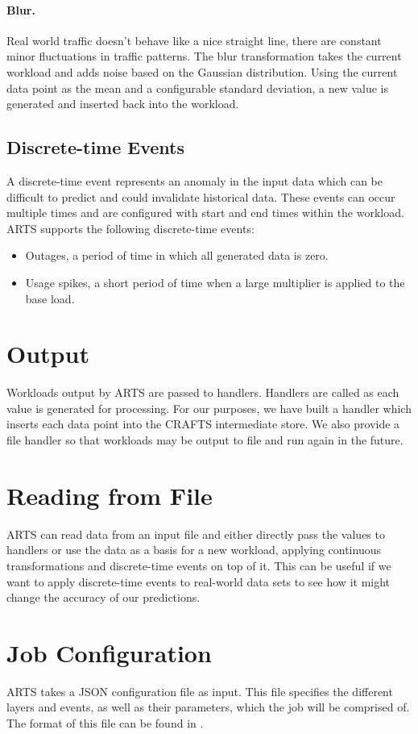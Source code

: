 \paragraph{Blur.} Real world traffic doesn't behave like a nice straight line, there are constant minor fluctuations in traffic patterns. The blur transformation takes the current workload and adds noise based on the Gaussian distribution. Using the current data point as the mean and a configurable standard deviation, a new value is generated and inserted back into the workload.

\subsection{Discrete-time Events}
A discrete-time event represents an anomaly in the input data which can be difficult to predict and could invalidate historical data. These events can occur multiple times and are configured with start and end times within the workload. ARTS supports the following discrete-time events:
\begin{itemize}
    \item Outages, a period of time in which all generated data is zero.
    \item Usage spikes, a short period of time when a large multiplier is applied to the base load.
\end{itemize}

\section{Output}
Workloads output by ARTS are passed to handlers. Handlers are called as each value is generated for processing. For our purposes, we have built a handler which inserts each data point into the CRAFTS intermediate store. We also provide a file handler so that workloads may be output to file and run again in the future.

\section{Reading from File}
ARTS can read data from an input file and either directly pass the values to handlers or use the data as a basis for a new workload, applying continuous transformations and discrete-time events on top of it. This can be useful if we want to apply discrete-time events to real-world data sets to see how it might change the accuracy of our predictions.

\section{Job Configuration}
ARTS takes a JSON configuration file as input. This file specifies the different layers and events, as well as their parameters, which the job will be comprised of. The format of this file can be found in .
